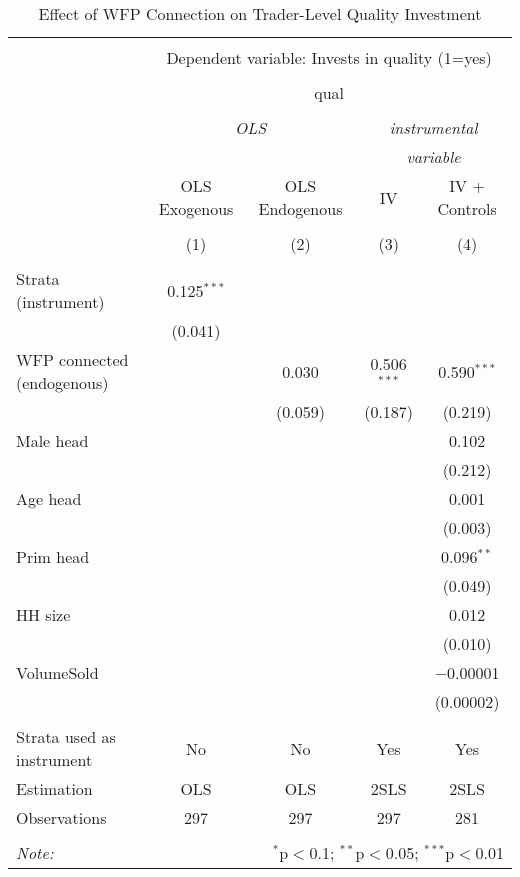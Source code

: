 
\begin{table}[!htbp] \centering 
  \caption{Effect of WFP Connection on Trader-Level Quality Investment} 
  \label{tab:wfp_trader_qual} 
\begin{tabular}{@{\extracolsep{5pt}}lcccc} 
\\[-1.8ex]\hline 
\hline \\[-1.8ex] 
 & \multicolumn{4}{c}{Dependent variable: Invests in quality (1=yes)} \\ 
\cline{2-5} 
\\[-1.8ex] & \multicolumn{4}{c}{qual} \\ 
\\[-1.8ex] & \multicolumn{2}{c}{\textit{OLS}} & \multicolumn{2}{c}{\textit{instrumental}} \\ 
 & \multicolumn{2}{c}{\textit{}} & \multicolumn{2}{c}{\textit{variable}} \\ 
 & OLS Exogenous & OLS Endogenous & IV & IV + Controls \\ 
\\[-1.8ex] & (1) & (2) & (3) & (4)\\ 
\hline \\[-1.8ex] 
 Strata (instrument) & 0.125$^{***}$ &  &  &  \\ 
  & (0.041) &  &  &  \\ 
  WFP connected (endogenous) &  & 0.030 & 0.506$^{***}$ & 0.590$^{***}$ \\ 
  &  & (0.059) & (0.187) & (0.219) \\ 
  Male head &  &  &  & 0.102 \\ 
  &  &  &  & (0.212) \\ 
  Age head &  &  &  & 0.001 \\ 
  &  &  &  & (0.003) \\ 
  Prim head &  &  &  & 0.096$^{**}$ \\ 
  &  &  &  & (0.049) \\ 
  HH size &  &  &  & 0.012 \\ 
  &  &  &  & (0.010) \\ 
  VolumeSold &  &  &  & $-$0.00001 \\ 
  &  &  &  & (0.00002) \\ 
 \hline \\[-1.8ex] 
Strata used as instrument & No & No & Yes & Yes \\ 
Estimation & OLS & OLS & 2SLS & 2SLS \\ 
Observations & 297 & 297 & 297 & 281 \\ 
\hline 
\hline \\[-1.8ex] 
\textit{Note:}  & \multicolumn{4}{r}{$^{*}$p$<$0.1; $^{**}$p$<$0.05; $^{***}$p$<$0.01} \\ 
\end{tabular} 
\end{table} 
